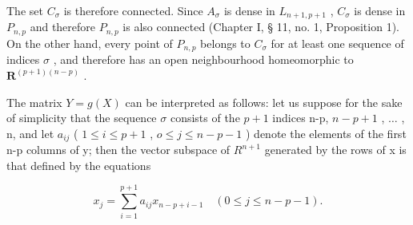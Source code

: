 The set \(C_{\sigma}\) is therefore connected. Since \(A_{\sigma}\) is dense in \(L_{n+1, p+1}\) , \(C_{\sigma}\) is dense in \(P_{n, p}\) and therefore \(P_{n, p}\) is also connected (Chapter I, § 11, no. 1, Proposition 1). On the other hand, every point of \(P_{n, p}\) belongs to \(C_{\sigma}\) for at least one sequence of indices \(\sigma\) , and therefore has an open neighbourhood homeomorphic to \(\mathbf{R}^{(p+1)(n-p)}\) .

The matrix \(Y=g(X)\) can be interpreted as follows: let us suppose for the sake of simplicity that the sequence \(\sigma\) consists of the \(p+1\) indices n-p, \(n-p+1\) , \(\ldots\) , n, and let \(a_{ij}\) ( \(1\leqslant i\leqslant p+1\) , \(o\leqslant j\leqslant n-p-1\) ) denote the elements of the first n-p columns of y; then the vector subspace of \(R^{n+1}\) generated by the rows of x is that defined by the equations

\[
x _ {j} = \sum_ {i = 1} ^ {p + 1} a _ {i j} x _ {n - p + i - 1} \quad (0 \leqslant j \leqslant n - p - 1).
\]

